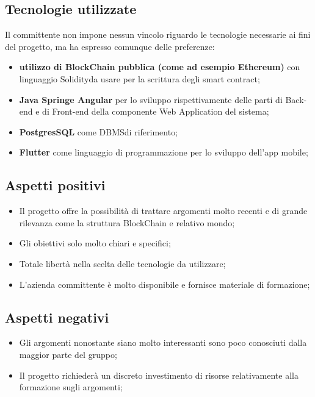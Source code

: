 \subsection{Tecnologie utilizzate}
Il committente non impone nessun vincolo riguardo le tecnologie necessarie ai fini del progetto, ma ha espresso comunque delle preferenze:
\begin{itemize}
	\item \textbf{utilizzo di BlockChain pubblica (come ad esempio Ethereum\glo)} con linguaggio Solidity\glo da usare per la scrittura degli {smart contract}\glo;
	\item \textbf{Java Spring\glo e Angular\glo} per lo sviluppo rispettivamente delle parti di Back-end e di Front-end della componente Web Application del sistema;
	\item \textbf{PostgresSQL\glo} come DBMS\glo di riferimento;
	\item \textbf{Flutter\glo} come linguaggio di programmazione per lo sviluppo dell'app mobile;
\end{itemize}

\subsection{Aspetti positivi}
\begin{itemize}
	\item Il progetto offre la possibilità di trattare argomenti molto recenti e di grande rilevanza come la struttura BlockChain e relativo mondo;
	\item Gli obiettivi solo molto chiari e specifici;
	\item Totale libertà nella scelta delle tecnologie da utilizzare;
	\item L'azienda committente è molto disponibile e fornisce materiale di formazione;
\end{itemize}

\subsection{Aspetti negativi}
\begin{itemize}
	\item Gli argomenti nonostante siano molto interessanti sono poco conosciuti dalla maggior parte del gruppo;
	\item Il progetto richiederà un discreto investimento di risorse relativamente alla formazione sugli argomenti;
\end{itemize}

